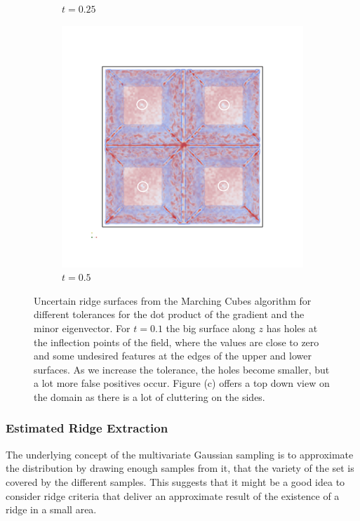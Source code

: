 \begin{figure}
\begin{subfigure}[]{0.49\textwidth}
        \caption{$t=0.25$}
        \label{fig:MCridgetol}
    \end{subfigure}
    \begin{subfigure}[]{0.49\textwidth}
        \includegraphics[width=\textwidth]{Images/MCridgetoltop.png}
        \caption{$t=0.5$}
        \label{fig:MCridgetop}
    \end{subfigure}
    \caption{Uncertain ridge surfaces from the Marching Cubes algorithm
    for different tolerances for the dot product of the gradient and the
    minor eigenvector. For $t=0.1$ the big surface along $z$ has holes
    at the inflection points of the field, where the values are close to
    zero and some undesired features at the edges of the upper and lower
    surfaces. As we increase the tolerance, the holes become smaller,
    but a lot more false positives occur. Figure (c) offers a top down
    view on the domain as there is a lot of cluttering on the sides.}
    \label{fig:MCridges}
\end{figure}

\subsubsection{Estimated Ridge Extraction}

The underlying concept of the multivariate Gaussian sampling is to
approximate the distribution by drawing enough samples from it, that
the variety of the set is covered by the different samples. This
suggests that it might be a good idea to consider ridge criteria that
deliver an approximate result of the existence of a ridge in a small
area.
